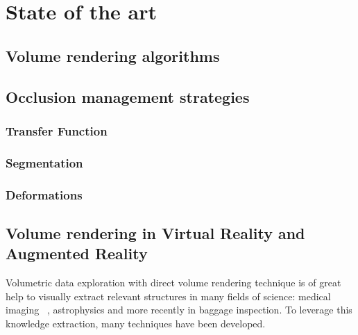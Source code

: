 \chapter{State of the art} %
\label{StateOfTheArt}

\section{Volume rendering algorithms}

\section{Occlusion management strategies}

\subsection{Transfer Function}

\subsection{Segmentation}

\subsection{Deformations}

\section{Volume rendering in Virtual Reality and Augmented Reality}


Volumetric data exploration with direct volume rendering technique is of great help to visually extract relevant structures in many fields of science: medical imaging ~\cite{ljung_full_2006}, astrophysics and more recently in baggage inspection. To leverage this knowledge extraction, many techniques have been developed. 

